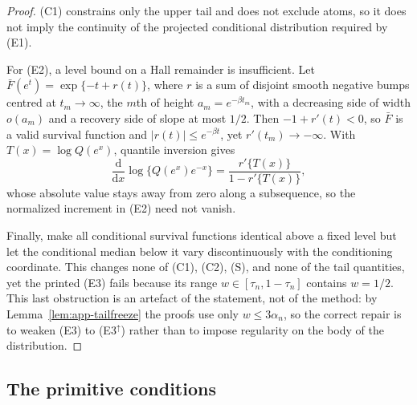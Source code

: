 \begin{proof}
(C1) constrains only the upper tail and does not exclude atoms, so it
does not imply the continuity of the projected conditional distribution
required by (E1).

For (E2), a level bound on a Hall remainder is insufficient. Let
$\bar F(e^t)=\exp\{-t+r(t)\}$, where $r$ is a sum of disjoint smooth
negative bumps centred at $t_m\to\infty$, the $m$th of height
$a_m=e^{-\beta t_m}$, with a decreasing side of width $o(a_m)$ and a
recovery side of slope at most $1/2$. Then $-1+r'(t)<0$, so $\bar F$ is
a valid survival function and $|r(t)|\le e^{-\beta t}$, yet
$r'(t_m)\to-\infty$. With $T(x)=\log Q(e^x)$, quantile inversion gives
\[
 \frac{\mathrm d}{\mathrm dx}\log\{Q(e^x)e^{-x}\}
 =\frac{r'\{T(x)\}}{1-r'\{T(x)\}},
\]
whose absolute value stays away from zero along a subsequence, so the
normalized increment in (E2) need not vanish.

Finally, make all conditional survival functions identical above a fixed
level but let the conditional median below it vary discontinuously with
the conditioning coordinate. This changes none of (C1), (C2), (S), and
none of the tail quantities, yet the printed (E3) fails because its
range $w\in[\tau_n,1-\tau_n]$ contains $w=1/2$. This last obstruction is
an artefact of the statement, not of the method: by
Lemma~\ref{lem:app-tailfreeze} the proofs use only $w\le3\alpha_n$, so
the correct repair is to weaken (E3) to (E3$^\uparrow$) rather than to
impose regularity on the body of the distribution.
\end{proof}

\subsection{The primitive conditions}

